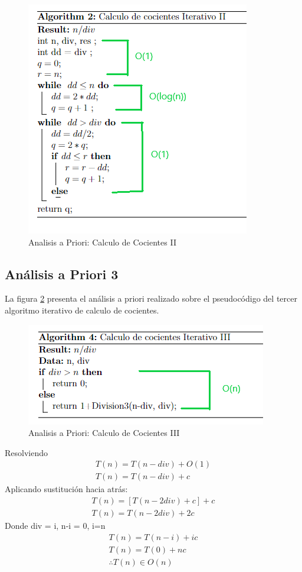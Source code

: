         \begin{figure}[htp!]
            \centering
            \includegraphics[width=0.7 \textwidth]{Images/A_Priori/priori_2.png}
            \caption{Analisis a Priori: Calculo de Cocientes II}
            \label{fig:priori2}
        \end{figure}
    
    \newpage
    \subsection{Análisis a Priori 3}
        La figura \ref{fig:priori3} presenta el análisis a priori realizado sobre el pseudocódigo del tercer algoritmo iterativo de calculo de cocientes. 
        \begin{figure}[htp!]
            \centering
            \includegraphics[width=0.7 \textwidth]{Images/A_Priori/priori_3.png}
            \caption{Analisis a Priori: Calculo de Cocientes III}
            \label{fig:priori3}
        \end{figure}
        Resolviendo 
        \begin{gather*}
            T(n) = T(n - div)+O(1)\\
            T(n) = T(n - div) + c
        \end{gather*}
        Aplicando sustitución hacia atrás:
        \begin{gather*}
            T(n)= [T(n - 2div)+c]+c\\
            T(n) = T(n - 2div)+2c
        \end{gather*}
        Donde div = i, n-i = 0, i=n
        \begin{gather*}
            T(n)=T(n-i)+ic\\
            T(n)=T(0)+nc\\
            \therefore  T(n)\in O(n)
        \end{gather*}

